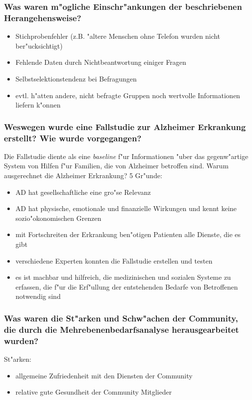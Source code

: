 \subsubsection{Was waren m"ogliche Einschr"ankungen der beschriebenen Herangehensweise?}
\begin{itemize}
        \item Stichprobenfehler (z.B. "altere Menschen ohne Telefon wurden nicht ber"ucksichtigt)
        \item Fehlende Daten durch Nichtbeantwortung einiger Fragen
        \item Selbstselektionstendenz bei Befragungen 
        \item evtl. h"atten andere, nicht befragte Gruppen noch wertvolle Informationen liefern k"onnen
\end{itemize}

\subsubsection{Weswegen wurde eine Fallstudie zur Alzheimer Erkrankung erstellt? Wie wurde vorgegangen?}
Die Fallstudie diente als eine \emph{baseline} f"ur Informationen "uber das gegenw"artige System von Hilfen f"ur Familien, die von Alzheimer betroffen sind. Warum ausgerechnet die Alzheimer Erkrankung? 5 Gr"unde:
\begin{itemize}
        \item AD hat gesellschaftliche eine gro"se Relevanz
        \item AD hat physische, emotionale und finanzielle Wirkungen und kennt keine sozio"okonomischen Grenzen
        \item mit Fortschreiten der Erkrankung ben"otigen Patienten alle Dienste, die es gibt
        \item verschiedene Experten konnten die Fallstudie erstellen und testen
        \item es ist machbar und hilfreich, die medizinischen und sozialen Systeme zu erfassen, die f"ur die Erf"ullung der entstehenden Bedarfe von Betroffenen notwendig sind
\end{itemize}

\subsubsection{Was waren die St"arken und Schw"achen der Community, die durch die Mehrebenenbedarfsanalyse herausgearbeitet wurden?}
St"arken:
\begin{itemize}
        \item allgemeine Zufriedenheit mit den Diensten der Community
        \item relative gute Gesundheit der Community Mitglieder
\end{itemize}

